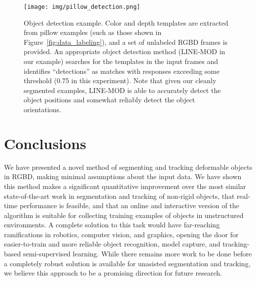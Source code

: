 \documentclass[graybox]{svmult}
\begin{document}
\begin{figure}
\centering
        \texttt{[image: img/pillow\_detection.png]}
\caption{\small{Object detection example. Color and depth templates are extracted from pillow examples (such as those shown in Figure~\ref{fig:data_labeling}), and a set of unlabeled RGBD frames is provided.  An appropriate object detection method (LINE-MOD in our example) searches for the templates in the input frames and identifies ``detections'' as matches with responses exceeding some threshold (0.75 in this experiment). Note that given our cleanly segmented examples, LINE-MOD is able to accurately detect the object positions and somewhat reliably detect the object orientations.}}
\label{fig:object_rec}
\end{figure}

\section{Conclusions}

We have presented a novel method of segmenting and tracking deformable objects in RGBD, making minimal assumptions about the input data.  We have shown this method makes a significant quantitative improvement over the most similar state-of-the-art work in segmentation and tracking of non-rigid objects, that real-time performance is feasible, and that an online and interactive version of the algorithm is suitable for collecting training examples of objects in unstructured environments.  A complete solution to this task would have far-reaching ramifications in robotics, computer vision, and graphics, opening the door for easier-to-train and more reliable object recognition, model capture, and tracking-based semi-supervised learning.  While there remains more work to be done before a completely robust solution is available for unasisted segmentation and tracking, we believe this approach to be a promising direction for future research.

\pagebreak

\small{


}
\end{document}
